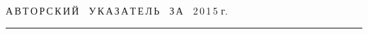 




\def\stat{cont}


{%




\raggedleft\Large \bf%


А\,В\,Т\,О\,Р\,С\,К\,И\,Й\ \ У\,К\,А\,З\,А\,Т\,Е\,Л\,Ь\ \ З\,А\ \ 2\,0\,1\,5 г. \vskip 17pt


    \hrule


    \par


 }







\label{st\stat}

















\def\leftkol{\ } %


\def\rightkol{\ } %






















\def\leftfootline{\small{\textbf{\thepage}


\hfill СИСТЕМЫ И СРЕДСТВА ИНФОРМАТИКИ\ \ \ выпуск~25\ \ \ №~4\ \ \ 2015}


}%


 \def\rightfootline{\small{СИСТЕМЫ И СРЕДСТВА ИНФОРМАТИКИ\ \ \ выпуск~25\ \ \


№~4\ \ \ 2015


 \hfill \textbf{\thepage}}}








